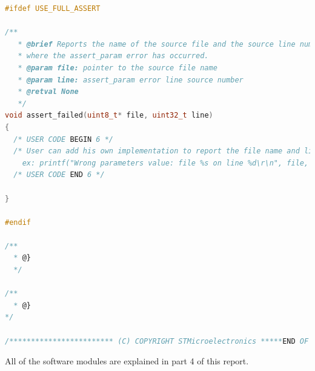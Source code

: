 \begin{lstlisting}[language = c]
#ifdef USE_FULL_ASSERT

/**
   * @brief Reports the name of the source file and the source line number
   * where the assert_param error has occurred.
   * @param file: pointer to the source file name
   * @param line: assert_param error line source number
   * @retval None
   */
void assert_failed(uint8_t* file, uint32_t line)
{
  /* USER CODE BEGIN 6 */
  /* User can add his own implementation to report the file name and line number,
    ex: printf("Wrong parameters value: file %s on line %d\r\n", file, line) */
  /* USER CODE END 6 */

}

#endif

/**
  * @}
  */ 

/**
  * @}
*/ 

/************************ (C) COPYRIGHT STMicroelectronics *****END OF FILE****/

\end{lstlisting}

All of the software modules are explained in part 4 of this report.\\


